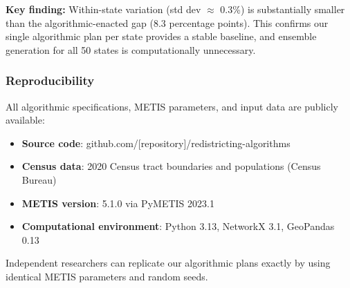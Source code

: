 \textbf{Key finding:} Within-state variation (std dev $\approx$ 0.3\%) is substantially smaller than the algorithmic-enacted gap (8.3 percentage points). This confirms our single algorithmic plan per state provides a stable baseline, and ensemble generation for all 50 states is computationally unnecessary.

\subsubsection{Reproducibility}

All algorithmic specifications, METIS parameters, and input data are publicly available:
\begin{itemize}
    \item \textbf{Source code}: github.com/[repository]/redistricting-algorithms
    \item \textbf{Census data}: 2020 Census tract boundaries and populations (Census Bureau)
    \item \textbf{METIS version}: 5.1.0 via PyMETIS 2023.1
    \item \textbf{Computational environment}: Python 3.13, NetworkX 3.1, GeoPandas 0.13
\end{itemize}

Independent researchers can replicate our algorithmic plans exactly by using identical METIS parameters and random seeds.
